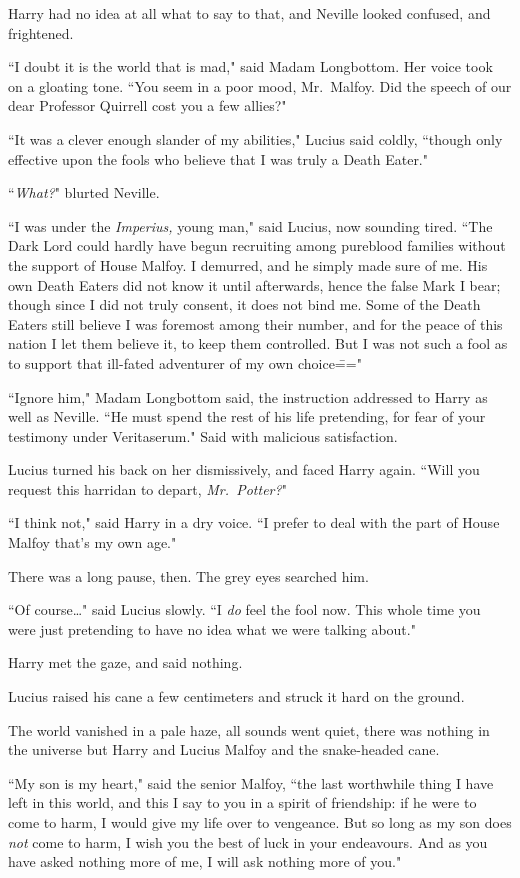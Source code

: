 Harry had no idea at all what to say to that, and Neville looked confused, and frightened.

``I doubt it is the world that is mad," said Madam Longbottom. Her voice took on a gloating tone. ``You seem in a poor mood, Mr.~Malfoy. Did the speech of our dear Professor Quirrell cost you a few allies?"

``It was a clever enough slander of my abilities," Lucius said coldly, ``though only effective upon the fools who believe that I was truly a Death Eater."

``\emph{What?}" blurted Neville.

``I was under the \emph{Imperius,} young man," said Lucius, now sounding tired. ``The Dark Lord could hardly have begun recruiting among pureblood families without the support of House Malfoy. I demurred, and he simply made sure of me. His own Death Eaters did not know it until afterwards, hence the false Mark I bear; though since I did not truly consent, it does not bind me. Some of the Death Eaters still believe I was foremost among their number, and for the peace of this nation I let them believe it, to keep them controlled. But I was not such a fool as to support that ill-fated adventurer of my own choice\==="

``Ignore him," Madam Longbottom said, the instruction addressed to Harry as well as Neville. ``He must spend the rest of his life pretending, for fear of your testimony under Veritaserum." Said with malicious satisfaction.

Lucius turned his back on her dismissively, and faced Harry again. ``Will you request this harridan to depart, \emph{Mr.~Potter?}"

``I think not," said Harry in a dry voice. ``I prefer to deal with the part of House Malfoy that's my own age."

There was a long pause, then. The grey eyes searched him.

``Of course{\ldots}" said Lucius slowly. ``I \emph{do} feel the fool now. This whole time you were just pretending to have no idea what we were talking about."

Harry met the gaze, and said nothing.

Lucius raised his cane a few centimeters and struck it hard on the ground.

The world vanished in a pale haze, all sounds went quiet, there was nothing in the universe but Harry and Lucius Malfoy and the snake-headed cane.

``My son is my heart," said the senior Malfoy, ``the last worthwhile thing I have left in this world, and this I say to you in a spirit of friendship: if he were to come to harm, I would give my life over to vengeance. But so long as my son does \emph{not} come to harm, I wish you the best of luck in your endeavours. And as you have asked nothing more of me, I will ask nothing more of you."

